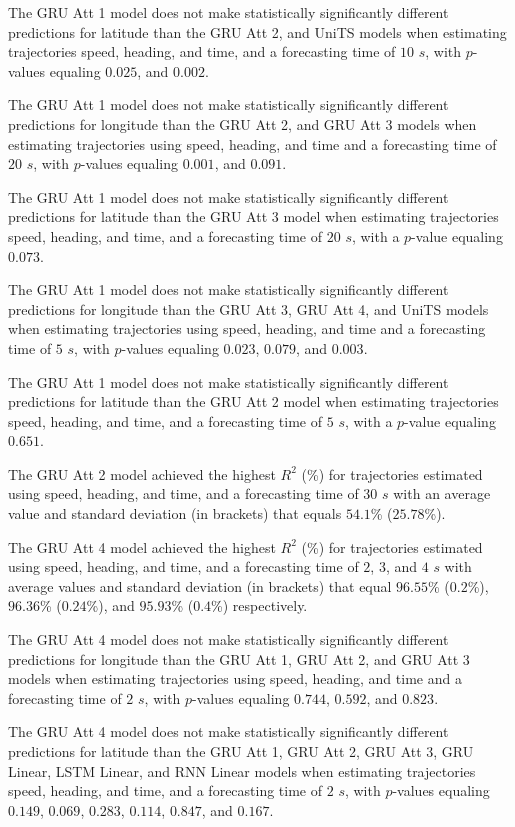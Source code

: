 The GRU Att 1 model does not make statistically significantly different predictions for latitude than the GRU Att 2, and UniTS models when estimating trajectories speed, heading, and time, and a forecasting time of $10$ $s$, with $p$-values equaling $0.025$, and $0.002$.

The GRU Att 1 model does not make statistically significantly different predictions for longitude than the GRU Att 2, and GRU Att 3 models when estimating trajectories using speed, heading, and time and a forecasting time of $20$ $s$, with $p$-values equaling $0.001$, and $0.091$.

The GRU Att 1 model does not make statistically significantly different predictions for latitude than the GRU Att 3 model when estimating trajectories speed, heading, and time, and a forecasting time of $20$ $s$, with a $p$-value equaling $0.073$.

The GRU Att 1 model does not make statistically significantly different predictions for longitude than the GRU Att 3, GRU Att 4, and UniTS models when estimating trajectories using speed, heading, and time and a forecasting time of $5$ $s$, with $p$-values equaling $0.023$, $0.079$, and $0.003$.

The GRU Att 1 model does not make statistically significantly different predictions for latitude than the GRU Att 2 model when estimating trajectories speed, heading, and time, and a forecasting time of $5$ $s$, with a $p$-value equaling $0.651$.

The GRU Att 2 model achieved the highest $R^{2}$ (\%) for trajectories estimated using speed, heading, and time, and a forecasting time of $30$ $s$ with an average value and standard deviation (in brackets) that equals $54.1$\% ($25.78$\%).

The GRU Att 4 model achieved the highest $R^{2}$ (\%) for trajectories estimated using speed, heading, and time, and a forecasting time of $2$, $3$, and $4$ $s$ with average values and standard deviation (in brackets) that equal $96.55$\% ($0.2$\%), $96.36$\% ($0.24$\%), and $95.93$\% ($0.4$\%) respectively.

The GRU Att 4 model does not make statistically significantly different predictions for longitude than the GRU Att 1, GRU Att 2, and GRU Att 3 models when estimating trajectories using speed, heading, and time and a forecasting time of $2$ $s$, with $p$-values equaling $0.744$, $0.592$, and $0.823$.

The GRU Att 4 model does not make statistically significantly different predictions for latitude than the GRU Att 1, GRU Att 2, GRU Att 3, GRU Linear, LSTM Linear, and RNN Linear models when estimating trajectories speed, heading, and time, and a forecasting time of $2$ $s$, with $p$-values equaling $0.149$, $0.069$, $0.283$, $0.114$, $0.847$, and $0.167$.

